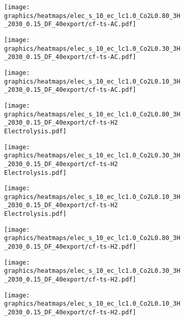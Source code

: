\clearpage
\onecolumn
\begin{figure}
    \centering
        \begin{subfigure}[t]{0.33\textwidth}
            \centering
        \texttt{[image: graphics/heatmaps/elec\_s\_10\_ec\_lc1.0\_Co2L0.80\_3H\_2030\_0.15\_DF\_40export/cf-ts-AC.pdf]}
    \end{subfigure}
    \begin{subfigure}[t]{0.33\textwidth}
        \centering
        \texttt{[image: graphics/heatmaps/elec\_s\_10\_ec\_lc1.0\_Co2L0.30\_3H\_2030\_0.15\_DF\_40export/cf-ts-AC.pdf]}
    \end{subfigure}
    \begin{subfigure}[t]{0.33\textwidth}
        \centering
        \texttt{[image: graphics/heatmaps/elec\_s\_10\_ec\_lc1.0\_Co2L0.10\_3H\_2030\_0.15\_DF\_40export/cf-ts-AC.pdf]}
    \end{subfigure}


    \begin{subfigure}[t]{0.33\textwidth}
        \centering
        \texttt{[image: graphics/heatmaps/elec\_s\_10\_ec\_lc1.0\_Co2L0.80\_3H\_2030\_0.15\_DF\_40export/cf-ts-H2 Electrolysis.pdf]}
    \end{subfigure}
    \begin{subfigure}[t]{0.33\textwidth}
        \centering
        \texttt{[image: graphics/heatmaps/elec\_s\_10\_ec\_lc1.0\_Co2L0.30\_3H\_2030\_0.15\_DF\_40export/cf-ts-H2 Electrolysis.pdf]}
    \end{subfigure}
    \begin{subfigure}[t]{0.33\textwidth}
        \centering
        \texttt{[image: graphics/heatmaps/elec\_s\_10\_ec\_lc1.0\_Co2L0.10\_3H\_2030\_0.15\_DF\_40export/cf-ts-H2 Electrolysis.pdf]}
    \end{subfigure}

    \begin{subfigure}[t]{0.33\textwidth}
        \centering
        \texttt{[image: graphics/heatmaps/elec\_s\_10\_ec\_lc1.0\_Co2L0.80\_3H\_2030\_0.15\_DF\_40export/cf-ts-H2.pdf]}
    \end{subfigure}
    \begin{subfigure}[t]{0.33\textwidth}
        \centering
        \texttt{[image: graphics/heatmaps/elec\_s\_10\_ec\_lc1.0\_Co2L0.30\_3H\_2030\_0.15\_DF\_40export/cf-ts-H2.pdf]}
    \end{subfigure}
    \begin{subfigure}[t]{0.33\textwidth}
        \centering
        \texttt{[image: graphics/heatmaps/elec\_s\_10\_ec\_lc1.0\_Co2L0.10\_3H\_2030\_0.15\_DF\_40export/cf-ts-H2.pdf]}
        

\end{subfigure}
\end{figure}
